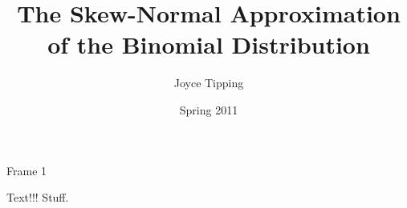 \documentclass{beamer}
\title[The Skew-Normal Approx of the Binomial]{The Skew-Normal Approximation\\of the Binomial Distribution}
\author{Joyce Tipping}
\institute{Truman State University}
\date{Spring 2011}
\begin{document}
\frame{\titlepage}

\begin{frame}
  Frame 1
  \begin{alertblock}{Text!!!}
    Stuff.
  \end{alertblock}
\end{frame}
\end{document}
